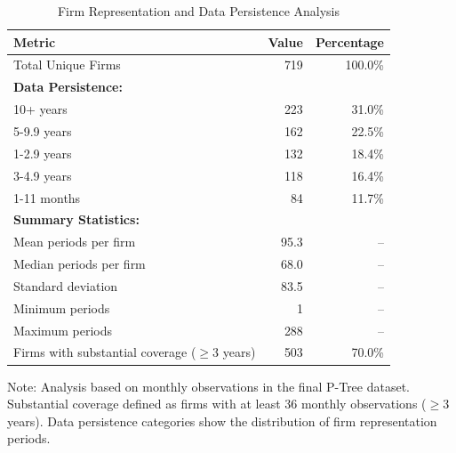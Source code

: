 
\begin{table}[htbp]
\centering
\caption{Firm Representation and Data Persistence Analysis}
\label{tab:firm_representation}
\begin{tabular}{lrr}
\toprule
\textbf{Metric} & \textbf{Value} & \textbf{Percentage} \\
\midrule
Total Unique Firms & 719 & 100.0\% \\
\midrule
\textbf{Data Persistence:} & & \\
10+ years & 223 & 31.0\% \\
5-9.9 years & 162 & 22.5\% \\
1-2.9 years & 132 & 18.4\% \\
3-4.9 years & 118 & 16.4\% \\
1-11 months & 84 & 11.7\% \\
\midrule
\textbf{Summary Statistics:} & & \\
Mean periods per firm & 95.3 & -- \\
Median periods per firm & 68.0 & -- \\
Standard deviation & 83.5 & -- \\
Minimum periods & 1 & -- \\
Maximum periods & 288 & -- \\
\midrule
Firms with substantial coverage ($\geq$3 years) & 503 & 70.0\% \\
\bottomrule
\end{tabular}
\begin{tablenotes}
\small
\item Note: Analysis based on monthly observations in the final P-Tree dataset.
Substantial coverage defined as firms with at least 36 monthly observations ($\geq$3 years).
Data persistence categories show the distribution of firm representation periods.
\end{tablenotes}
\end{table}
